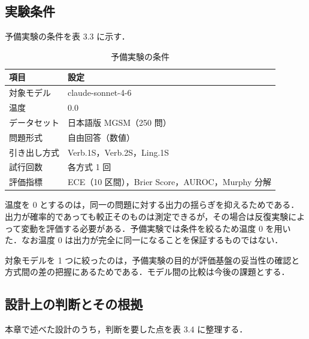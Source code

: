\subsection{実験条件}

予備実験の条件を表 3.3 に示す．

\begin{table}[t]
\centering
\small
\caption{予備実験の条件}
\label{tab:3.3}
\begin{tabularx}{\textwidth}{|l|X|}
\hline
項目 & 設定 \\
\hline
対象モデル & claude-sonnet-4-6 \\
温度 & 0.0 \\
データセット & 日本語版 MGSM（250 問） \\
問題形式 & 自由回答（数値） \\
引き出し方式 & Verb.1S，Verb.2S，Ling.1S \\
試行回数 & 各方式 1 回 \\
評価指標 & ECE（10 区間），Brier Score，AUROC，Murphy 分解 \\
\hline
\end{tabularx}
\end{table}

温度を 0 とするのは，同一の問題に対する出力の揺らぎを抑えるためである．出力が確率的であっても較正そのものは測定できるが，その場合は反復実験によって変動を評価する必要がある．予備実験では条件を絞るため温度 0 を用いた．なお温度 0 は出力が完全に同一になることを保証するものではない．

対象モデルを 1 つに絞ったのは，予備実験の目的が評価基盤の妥当性の確認と方式間の差の把握にあるためである．モデル間の比較は今後の課題とする．

\subsection{設計上の判断とその根拠}

本章で述べた設計のうち，判断を要した点を表 3.4 に整理する．

